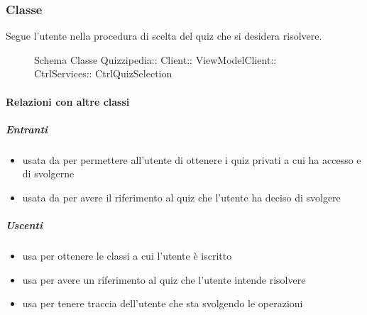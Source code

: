 \subsubsection{Classe }
Segue l'utente nella procedura di scelta del quiz che si desidera risolvere.
\begin{figure}[H]
\centering
\noindent{}
\caption[Schema Classe CtrlQuizSelection]{Schema Classe Quizzipedia:: Client:: ViewModelClient:: CtrlServices:: CtrlQuizSelection}
\end{figure}
\paragraph{Relazioni con altre classi}
\subparagraph{Entranti}
\begin{itemize}
\item usata da  per permettere all'utente di ottenere i quiz privati a cui ha accesso e di svolgerne
\item usata da  per avere il riferimento al quiz che l'utente ha deciso di svolgere
\end{itemize}
\subparagraph{Uscenti}
\begin{itemize}
\item usa  per ottenere le classi a cui l'utente è iscritto
\item usa  per avere un riferimento al quiz che l'utente intende risolvere
\item usa  per tenere traccia dell'utente che sta svolgendo le operazioni
\end{itemize}
